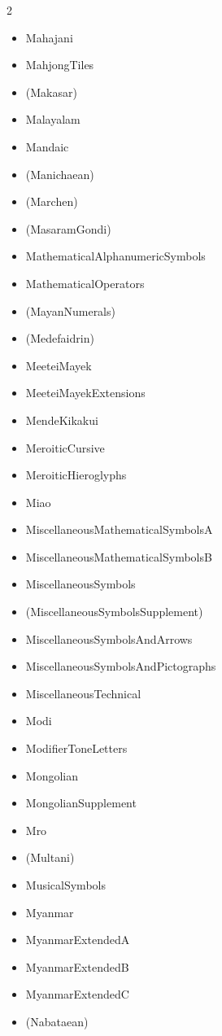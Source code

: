 \documentclass{article}
\newenvironment{itemlist}{%
  \begin{itemize}
  \setlength{\itemsep}{0pt}
  \setlength{\parsep}{0pt}
  \setlength{\topsep}{0pt}
  \setlength{\partopsep}{0pt}
  \setlength{\parskip}{0pt}
  \setlength{\labelsep}{5pt}}%
{
  \end{itemize}}
\begin{document}
\begin{multicols*}{2}
\begin{itemlist}
        \item Mahajani
        \item MahjongTiles
        \item (Makasar)
        \item Malayalam
        \item Mandaic
        \item (Manichaean)
        \item (Marchen)
        \item (MasaramGondi)
        \item MathematicalAlphanumericSymbols
        \item MathematicalOperators
        \item (MayanNumerals)
        \item (Medefaidrin)
        \item MeeteiMayek
        \item MeeteiMayekExtensions
        \item MendeKikakui
        \item MeroiticCursive
        \item MeroiticHieroglyphs
        \item Miao
        \item MiscellaneousMathematicalSymbolsA
        \item MiscellaneousMathematicalSymbolsB
        \item MiscellaneousSymbols
        \item (MiscellaneousSymbolsSupplement)
        \item MiscellaneousSymbolsAndArrows
        \item MiscellaneousSymbolsAndPictographs
        \item MiscellaneousTechnical
        \item Modi
        \item ModifierToneLetters
        \item Mongolian
        \item MongolianSupplement
        \item Mro
        \item (Multani)
        \item MusicalSymbols
        \item Myanmar
        \item MyanmarExtendedA
        \item MyanmarExtendedB
        \item MyanmarExtendedC
        \item (Nabataean)

\end{itemlist}
\end{multicols*}
\end{document}
